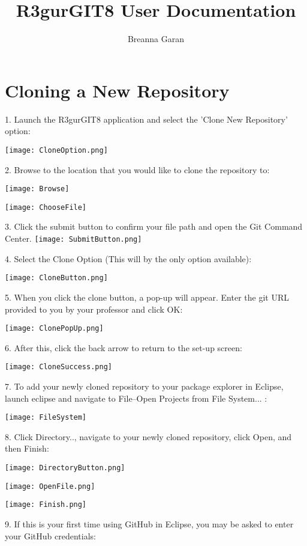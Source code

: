 \documentclass{article}
\title{R3gurGIT8 User Documentation}
\author{Breanna Garan}
\date{}
\begin{document}
\maketitle
\newpage
\tableofcontents
\newpage
\doublespacing

\section{Cloning a New Repository}
1. Launch the R3gurGIT8 application and select the 'Clone New Repository' option:

\texttt{[image: CloneOption.png]}

2. Browse to the location that you would like to clone the repository to:

\texttt{[image: Browse]}

\texttt{[image: ChooseFile]}

3. Click the submit button to confirm your file path and open the Git Command Center.
\texttt{[image: SubmitButton.png]}

\newpage

4. Select the Clone Option (This will by the only option available):

\texttt{[image: CloneButton.png]}

5. When you click the clone button, a pop-up will appear.  Enter the git URL provided to you by your professor and click OK:

\texttt{[image: ClonePopUp.png]}

\newpage 

6. After this, click the back arrow to return to the set-up screen:

\texttt{[image: CloneSuccess.png]}



7. To add your newly cloned repository to your package explorer in Eclipse, launch eclipse and navigate to File--Open Projects from File System... :

\texttt{[image: FileSystem]}

8. Click Directory.., navigate to your newly cloned repository, click Open, and then Finish:

\texttt{[image: DirectoryButton.png]}

\texttt{[image: OpenFile.png]}

\texttt{[image: Finish.png]}

9. If this is your first time using GitHub in Eclipse, you may be asked to enter your GitHub credentials:
\end{document}
